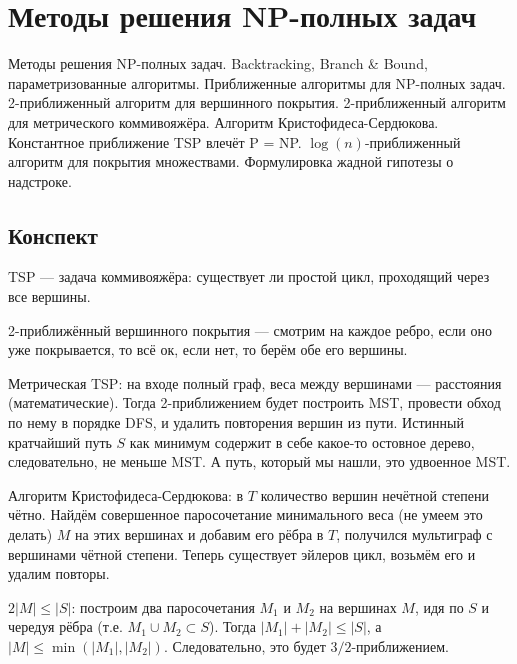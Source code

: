 \section{Методы решения NP-полных задач}
Методы решения NP-полных задач.
Backtracking, Branch \& Bound, параметризованные алгоритмы.
Приближенные алгоритмы для NP-полных задач.
2-приближенный алгоритм для вершинного покрытия.
2-приближенный алгоритм для метрического коммивояжёра.
Алгоритм Кристофидеса-Сердюкова.
Константное приближение TSP влечёт P = NP.
$\log(n)$-приближенный алгоритм для покрытия множествами.
Формулировка жадной гипотезы о надстроке.

\subsection{Конспект}
TSP --- задача коммивояжёра:
существует ли простой цикл,
проходящий через все вершины.

\bigskip

2-приближённый вершинного покрытия
--- смотрим на каждое ребро, если оно уже покрывается,
то всё ок, если нет, то берём обе его вершины.

\bigskip

Метрическая TSP: на входе полный граф,
веса между вершинами --- расстояния (математические).
Тогда 2-приближением будет построить MST,
провести обход по нему в порядке DFS,
и удалить повторения вершин из пути.
Истинный кратчайший путь $S$
как минимум содержит в себе какое-то
остовное дерево, следовательно,
не меньше MST.
А путь, который мы нашли, это удвоенное MST.

\bigskip

Алгоритм Кристофидеса-Сердюкова:
в $T$ количество вершин нечётной степени чётно.
Найдём совершенное паросочетание
минимального веса (не умеем это делать) $M$
на этих вершинах
и добавим его рёбра в $T$,
получился мультиграф с вершинами чётной степени.
Теперь существует эйлеров цикл,
возьмём его и удалим повторы.

$2 |M| \le |S|$:
построим два паросочетания $M_1$ и $M_2$ на вершинах $M$,
идя по $S$ и чередуя рёбра (т.е. $M_1 \cup M_2 \subset S$).
Тогда $|M_1| + |M_2| \le |S|$,
а $|M| \le \min(|M_1|, |M_2|)$.
Следовательно, это будет $3/2$-приближением.

